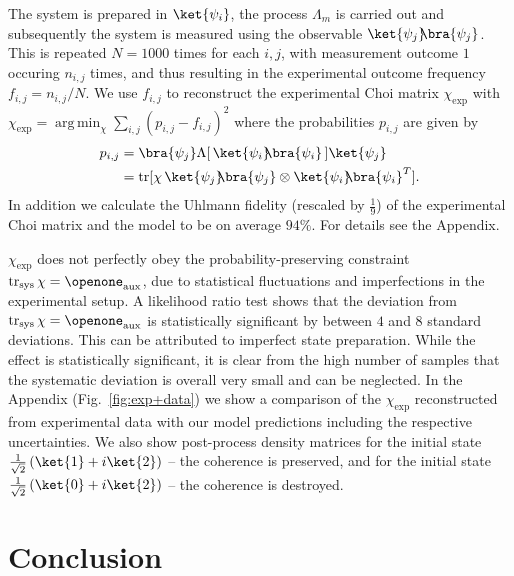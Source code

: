 \documentclass[12pt,
onecolumn,
superscriptaddress,
floatfix,
]{revtex4-2}
\DeclareMathOperator{\argmin}{arg\,min}
\DeclareMathOperator{\tr}{tr}
\newcommand{\ketbra}[2]{{\ket{#1}\!\!\bra{#2}}}
\newcommand{\proj}[1]{{\ketbra{#1}{#1}}}
\begin{document}
The system is prepared in $\ket{\psi_i}$, the process $\Lambda_m$ is carried out and
 subsequently the system is measured using the observable $\proj{\psi_j}$.
This is repeated $N=1000$ times for each $i,j$, with measurement outcome $1$ occuring $n_{i,j}$ times, and thus resulting in the experimental outcome frequency $f_{i,j}=n_{i,j}/N$.
We use $f_{i,j}$ to reconstruct the experimental Choi matrix $\chi_\mathrm{exp}$ with $\chi_\mathrm{exp}= \argmin_\chi \sum_{i,j} (p_{i,j}-f_{i,j})^2$
where the probabilities $p_{i,j}$ are given by
\begin{equation}\begin{split}
 p_{i,j} &= \bra{\psi_j}\Lambda[\,\proj{\psi_i}\,]\ket{\psi_j} \\
         &= \tr[\chi\, \proj{\psi_j}\otimes \proj{\psi_i}^T].
\end{split}\end{equation}
In addition we calculate the Uhlmann fidelity (rescaled by $\frac{1}{9}$) of the experimental Choi matrix and the model to be on average $94\%$.
For details see the Appendix.

$\chi_\mathrm{exp}$ does not perfectly obey the 
 probability-preserving constraint $\tr_\mathrm{sys}\chi= 
 \openone_\mathrm{aux}$, due to statistical fluctuations and imperfections in 
 the experimental setup.
A likelihood ratio test shows that the deviation from $\tr_\mathrm{sys}\chi= 
 \openone_\mathrm{aux}$ is statistically significant by between $4$ and $8$ 
 standard deviations.
This can be attributed to imperfect state preparation.
While the effect is statistically significant, it is clear from the high number 
 of samples that the systematic deviation is overall very small and can be 
 neglected.
In the Appendix (Fig.~\ref{fig:exp+data})  we show a comparison of the $\chi_{\mathrm{exp}}$ reconstructed from experimental data
 with our model predictions including the respective uncertainties.
We also show post-process density matrices for the initial state
 $\frac{1}{\sqrt{2}} \left(\ket{1} + i\ket{2}\right)$ -- the coherence is preserved, and for the initial state $\frac{1}{\sqrt{2}}\left(\ket{0} + i\ket{2}\right)$ -- the coherence is destroyed.
 
\section{Conclusion}
\end{document}
